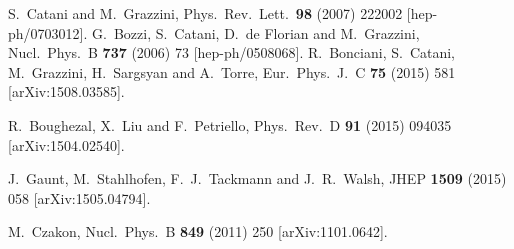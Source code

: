 \documentclass[12pt]{article}
\begin{document}
\begin{thebibliography}{99}
  S.~Catani and M.~Grazzini,
  Phys.\ Rev.\ Lett.\  {\bf 98} (2007) 222002
  [hep-ph/0703012].
%
  G.~Bozzi, S.~Catani, D.~de Florian and M.~Grazzini,
  Nucl.\ Phys.\ B {\bf 737} (2006) 73
  [hep-ph/0508068].
%
  R.~Bonciani, S.~Catani, M.~Grazzini, H.~Sargsyan and A.~Torre,
  Eur.\ Phys.\ J.\ C {\bf 75} (2015)   581
  [arXiv:1508.03585].




  R.~Boughezal, X.~Liu and F.~Petriello,
  Phys.\ Rev.\ D {\bf 91} (2015) 094035
  [arXiv:1504.02540].

  J.~Gaunt, M.~Stahlhofen, F.~J.~Tackmann and J.~R.~Walsh,
  JHEP {\bf 1509} (2015) 058
  [arXiv:1505.04794].

  M.~Czakon,
  Nucl.\ Phys.\ B {\bf 849} (2011) 250
  [arXiv:1101.0642].


\end{thebibliography}
\end{document}
